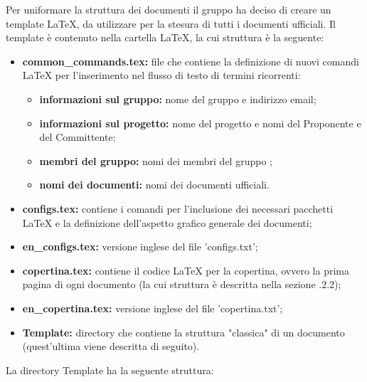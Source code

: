         Per uniformare la struttura dei documenti il gruppo ha deciso di creare un template \LaTeX{}, da utilizzare per la stesura di tutti i documenti ufficiali. Il template è contenuto nella cartella \LaTeX{}, la cui struttura è la seguente:
        \begin{itemize}
          \item \textbf{common\_commands.tex:} file che contiene la definizione di nuovi comandi \LaTeX{} per l'inserimento nel flusso di testo di termini ricorrenti:
            \begin{itemize}
              \item \textbf{informazioni sul gruppo:} nome del gruppo e indirizzo email;
              \item \textbf{informazioni sul progetto:} nome del progetto e nomi del Proponente e del Committente;
              \item \textbf{membri del gruppo:} nomi dei membri del gruppo \Gruppo;
              \item \textbf{nomi dei documenti:} nomi dei documenti ufficiali.
            \end{itemize}
          \item \textbf{configs.tex:} contiene i comandi per l'inclusione dei necessari pacchetti \LaTeX{} e la definizione dell'aspetto grafico generale dei documenti;
          \item \textbf{en\_configs.tex:} versione inglese del file 'configs.txt';
          \item \textbf{copertina.tex:} contiene il codice \LaTeX{} per la copertina, ovvero la prima pagina di ogni documento (la cui struttura è descritta nella sezione .2.2);
          \item \textbf{en\_copertina.tex:}  versione inglese del file 'copertina.txt';
          \item \textbf{Template:} directory che contiene la struttura "classica" di un documento (quest'ultima viene descritta di seguito).
        \end{itemize}
        La directory Template ha la seguente struttura:
